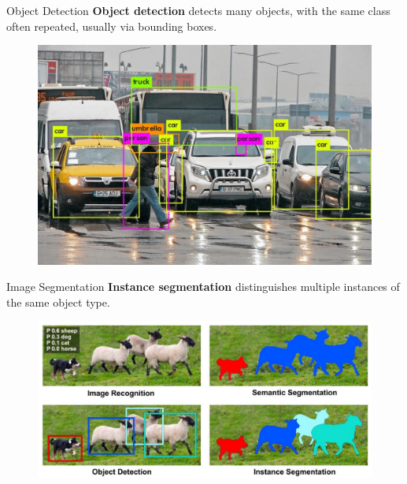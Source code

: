 \begin{frame}[allowframebreaks]

\begin{mydefinitionblock}{8.21}{Object Detection}
    \textbf{Object detection} detects many objects, with the same class often repeated, usually via bounding boxes.

    \begin{figure}[H]
        \centering
        \includegraphics[width=1.0\textwidth]{.././assets/8.22.png}
    \end{figure}
\end{mydefinitionblock}

\end{frame}

\begin{frame}[allowframebreaks]

\begin{mydefinitionblock}{8.22}{Image Segmentation}
    \textbf{Instance segmentation} distinguishes multiple instances of the same object type.

    \begin{figure}[H]
        \centering
        \includegraphics[width=1.0\textwidth]{.././assets/8.23.png}
    \end{figure}
\end{mydefinitionblock}

\end{frame}


